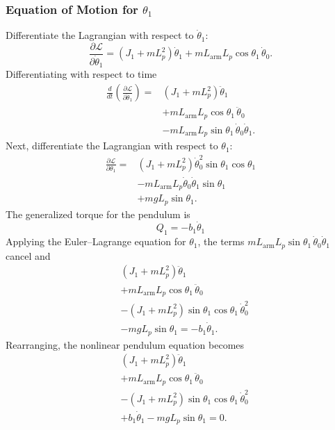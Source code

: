 \documentclass[a4paper,11pt]{article}
\newcommand{\La}{L_{\mathrm{arm}}}
\begin{document}
\subsubsection{Equation of Motion for \texorpdfstring{$\theta_1$}{theta1}}
Differentiate the Lagrangian with respect to $\dot\theta_1$:
\begin{equation}
  \frac{\partial \mathcal{L}}{\partial \dot\theta_1} = \left(J_1 + m L_p^2\right)\dot\theta_1 + m \La L_p \cos\theta_1\,\dot\theta_0 .
\end{equation}
Differentiating with respect to time
\begin{equation}
\begin{aligned}
  \frac{d}{dt}\left(\frac{\partial \mathcal{L}}{\partial \dot\theta_1}\right) = {}& \left(J_1 + m L_p^2\right)\ddot\theta_1\\
  & + m \La L_p \cos\theta_1\,\ddot\theta_0\\
  & - m \La L_p \sin\theta_1\,\dot\theta_0 \dot\theta_1 .
\end{aligned}
\end{equation}
Next, differentiate the Lagrangian with respect to $\theta_1$:
\begin{equation}
\begin{aligned}
  \frac{\partial \mathcal{L}}{\partial \theta_1} = {}& \left(J_1 + m L_p^2\right)\dot\theta_0^2 \sin\theta_1 \cos\theta_1\\
  & - m \La L_p \dot\theta_0 \dot\theta_1 \sin\theta_1\\
  & + m g L_p \sin\theta_1 .
\end{aligned}
\end{equation}
The generalized torque for the pendulum is
\begin{equation}
  Q_1 = -b_1 \dot\theta_1
\end{equation}
Applying the Euler--Lagrange equation for $\theta_1$, the terms $m \La L_p \sin\theta_1\,\dot\theta_0 \dot\theta_1$ cancel and
\begin{equation}
\begin{aligned}
  & \left(J_1 + m L_p^2\right)\ddot\theta_1\\
  & + m \La L_p \cos\theta_1\,\ddot\theta_0\\
  & - \left(J_1 + m L_p^2\right)\sin\theta_1 \cos\theta_1\,\dot\theta_0^2\\
  & - m g L_p \sin\theta_1 = -b_1 \dot\theta_1 .
\end{aligned}
\end{equation}
Rearranging, the nonlinear pendulum equation becomes
\begin{equation}
\begin{aligned}
  & \left(J_1 + m L_p^2\right)\ddot\theta_1\\
  & + m \La L_p \cos\theta_1\,\ddot\theta_0\\
  & - \left(J_1 + m L_p^2\right)\sin\theta_1 \cos\theta_1\,\dot\theta_0^2\\
  & + b_1 \dot\theta_1 - m g L_p \sin\theta_1 = 0 .
\end{aligned}
\label{eq:pend_nl}
\end{equation}
\end{document}
